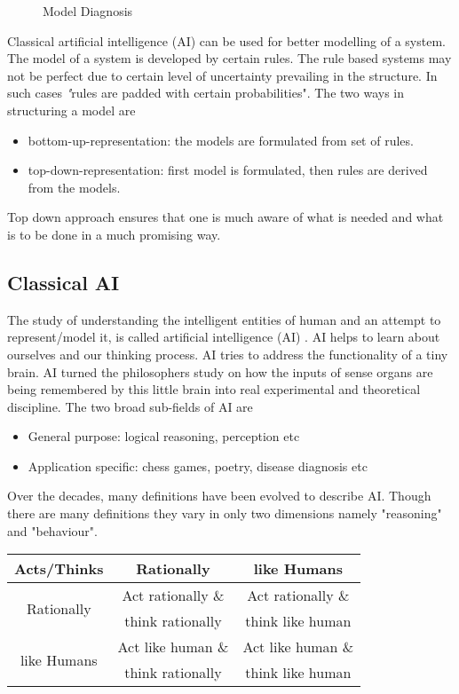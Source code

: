\documentclass{bmcart}
\begin{document}
\begin{figure}[h]
	\centering
	\caption{Model Diagnosis}
	\label{fig:sysDiagnosis}
\end{figure}

Classical artificial intelligence (AI) can be used for better modelling of a system. The model of a system is developed by certain rules. The rule based systems may not be perfect due to certain level of uncertainty prevailing in the structure. In such cases 
{\textit "rules are padded with certain probabilities"}. The two ways in structuring a
model are 
\begin{itemize}
\item bottom-up-representation: the models are formulated from set of rules.
\item top-down-representation: first model is formulated, then rules are derived from the models.
\end{itemize}

Top down approach ensures that one is much aware of what is needed and what is to be done in a much promising way.

\subsection{Classical AI}
\label{ssec:cAI}

The study of understanding the intelligent entities of human and an attempt to represent/model it, is called artificial intelligence (AI) \cite{russelNorwig}.
AI helps to learn about ourselves and our thinking process. AI tries to address the functionality of a tiny brain. AI turned the philosophers study on how the inputs of sense organs are being remembered by this little brain into real experimental and theoretical discipline. The two broad sub-fields of AI are
\begin{itemize}
\item General purpose: logical reasoning, perception etc
\item Application specific: chess games, poetry, disease diagnosis etc
\end{itemize}

Over the decades, many definitions have been evolved to describe AI. Though there are many definitions they vary in only two dimensions namely "reasoning" and "behaviour".

\begin{table}[h]
\centering
\begin{tabular}{|c|c|c|}
\hline
{Acts}/{Thinks}	 & Rationally & like Humans \\ \hline
\multirow{2}{*}{Rationally}  & Act rationally \& & Act rationally \& \\
							& think rationally & think like human  \\ \hline
\multirow{2}{*}{like Humans}  & Act like human \& & Act like human \& \\
							& think rationally & think like human  \\ \hline							
\end{tabular}
\end{table}
\end{document}

